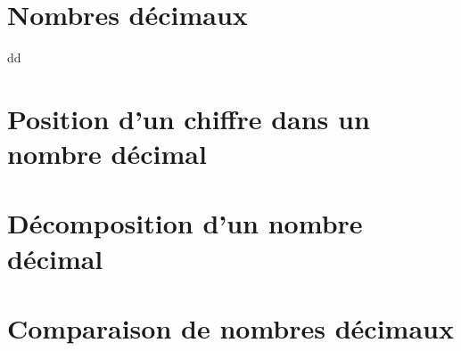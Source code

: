 \begin{pageCours} 

\section{Nombres décimaux}


\begin{DefT}{ dd}
\end{DefT}

\begin{Rep}


\end{Rep}






\section{Position d'un chiffre dans un nombre décimal}

\end{pageCours} 
\begin{pageAD} 


 
 


\end{pageAD}  
\begin{pageCours} 

\section{Décomposition d'un nombre décimal}



\section{Comparaison de nombres décimaux}



\end{pageCours} 
